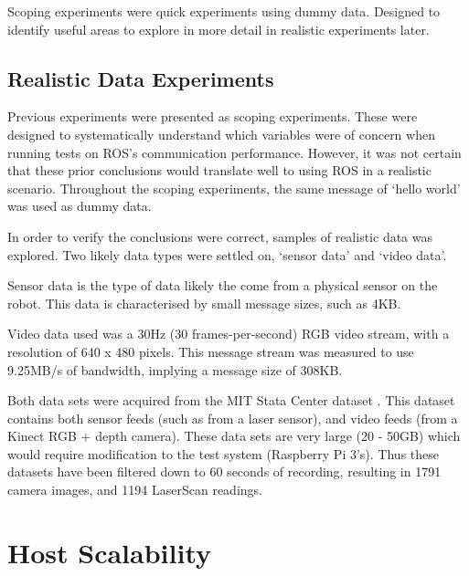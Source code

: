 \documentclass{l4proj}
\begin{document}
Scoping experiments were quick experiments using dummy data. Designed to identify useful areas to explore in more detail in realistic experiments later.









\section{Realistic Data Experiments}

Previous experiments were presented as scoping experiments. These were designed to systematically understand which variables were of concern when running tests on ROS's communication performance. However, it was not certain that these prior conclusions would translate well to using ROS in a realistic scenario. Throughout the scoping experiments, the same message of `hello world' was used as dummy data.

In order to verify the conclusions were correct, samples of realistic data was explored. Two likely data types were settled on, `sensor data' and `video data'.

Sensor data is the type of data likely the come from a physical sensor on the robot. This data is characterised by small message sizes, such as 4KB.

Video data used was a 30Hz (30 frames-per-second) RGB video stream, with a resolution of 640 x 480 pixels. This message stream was measured to use 9.25MB/s of bandwidth, implying a message size of 308KB.

Both data sets were acquired from the MIT Stata Center dataset \cite{mit-stata-center-dataset}. This dataset contains both sensor feeds (such as from a laser sensor), and video feeds (from a Kinect RGB + depth camera). These data sets are very large (20 - 50GB) which would require modification to the test system (Raspberry Pi 3’s). Thus these datasets have been filtered down to 60 seconds of recording, resulting in 1791 camera images, and 1194 LaserScan readings.





\chapter{Host Scalability}
\label{host-scalability-chapter}
\end{document}
